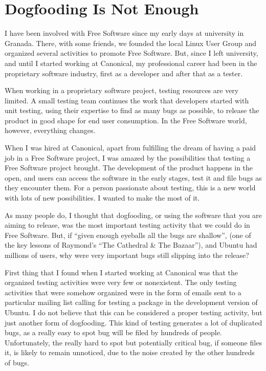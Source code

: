 

\section*{Dogfooding Is Not Enough} 

I have been involved with Free Software since my early days at university in
Granada. There, with some friends, we founded the local Linux User
Group and organized several activities to
promote Free Software. But, since I left university, and until I started working
at Canonical, my professional career had been in the proprietary software
industry, first as a developer and after that as a tester.

When working in a proprietary software project, testing resources are very
limited. A small testing team continues the work that developers started with
unit testing, using their expertise to find as many bugs as possible, to release
the product in good shape for end user consumption. In the Free Software world,
however, everything changes.

When I was hired at Canonical, apart from fulfilling the dream of having a paid
job in a Free Software project, I was amazed by the possibilities that testing a
Free Software project brought. The development of the product happens in the
open, and users can access the software in the early stages, test it and file
bugs as they encounter them. For a person passionate about testing, this is a new
world with lots of new possibilities. I wanted to make the most of it.

As many people do, I thought that dogfooding, or using the software that you are
aiming to release, was the most important testing activity that we could do in
Free Software. But, if ``given enough eyeballs all the bugs are shallow'', (one of
the key lessons of Raymond's ``The Cathedral \& The Bazaar''), and Ubuntu had
millions of users, why were very important bugs still slipping into the release?

First thing that I found when I started working at Canonical was that the
organized testing activities were very few or nonexistent. The only testing
activities that were somehow organized were in the form of emails sent to a
particular mailing list calling for testing a package in the development version
of Ubuntu. I do not believe that this can be considered a proper testing
activity, but just another form of dogfooding. This kind of testing generates a
lot of duplicated bugs, as a really easy to spot bug will be filed by hundreds
of people. Unfortunately, the really hard to spot but potentially critical bug,
if someone files it, is likely to remain unnoticed, due to the noise created by
the other hundreds of bugs.

